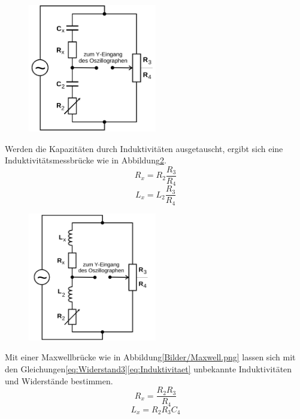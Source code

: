 \begin{figure}
  \centering
  \includegraphics[width=0.5\textwidth]{Bilder/Capazitaetsbruecke.png}
  \caption{}
  \label{fig:capbruecke}
\end{figure}
Werden die Kapazitäten durch Induktivitäten ausgetauscht, ergibt sich eine
Induktivitätsmessbrücke wie in Abbildung\ref{fig:indbruecke}.
\begin{equation}
R_x=R_2\frac{R_3}{R_4}
\end{equation}
\begin{equation}
L_x=L_2 \frac{R_3}{R_4}
\end{equation}
\begin{figure}
  \centering
  \includegraphics[width=0.5\textwidth]{Bilder/Induktivitaetsbruecke.png}
  \caption{}
  \label{fig:indbruecke}
\end{figure}
Mit einer Maxwellbrücke wie in Abbildung\ref{Bilder/Maxwell.png} lassen sich mit
den Gleichungen\eqref{eq:Widerstand3}\eqref{eq:Induktivitaet} unbekannte
Induktivitäten und Widerstände bestimmen.
\begin{equation}
R_x= \frac{R_2 R_3}{R_4}
\label{eq:Widerstand3}
\end{equation}
\begin{equation}
L_x=R_2 R_3 C_4
\label{eq:Induktivitaet}
\end{equation}
